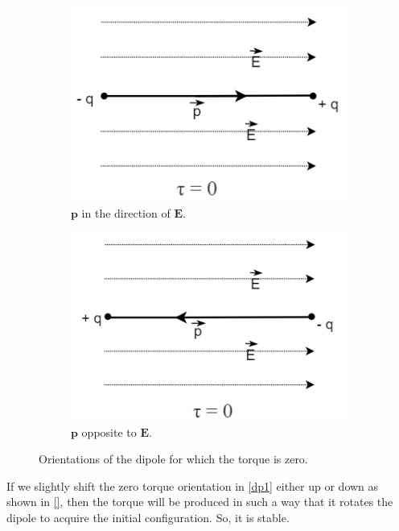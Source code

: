 \begin{figure}[h]
    \centering
    \begin{subfigure}[b]{0.45\textwidth}
    \centering
    \includegraphics[scale = 0.6]{figures/elecmag/dipoles1.png}
     \caption{$\bm{p}$ in the direction of $\bm{E}$.}
     \label{dp}
    \end{subfigure}
    \hfill
     \begin{subfigure}[b]{0.45\textwidth}
     \centering
    \includegraphics[scale = 0.6]{figures/elecmag/dipoles2.png}
     \caption{$\bm{p}$ opposite to $\bm{E}$.}
     \label{dp}
    \end{subfigure}
    \caption{Orientations of the dipole for which the torque is zero.}
    \label{dipoles}
\end{figure}

If we slightly shift the zero torque orientation in \ref{dp1} either up or down as shown in \ref{}, then the torque will be produced in such a way that it rotates the dipole to acquire the initial configuration. So, it is stable.\\

